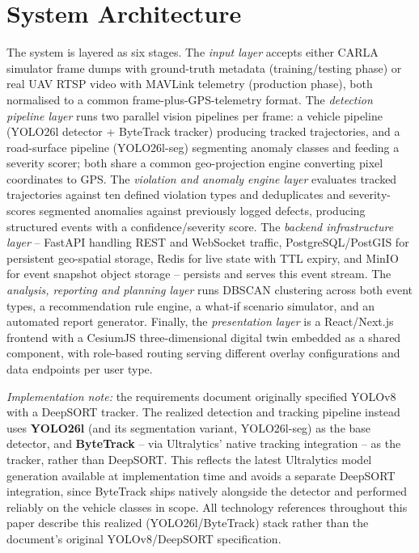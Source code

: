 \documentclass[conference]{IEEEtran}
\begin{document}
\section{System Architecture}
\label{sec:architecture}

The system is layered as six stages. The \textit{input layer} accepts either CARLA simulator frame dumps with ground-truth metadata (training/testing phase) or real UAV RTSP video with MAVLink telemetry (production phase), both normalised to a common frame-plus-GPS-telemetry format. The \textit{detection pipeline layer} runs two parallel vision pipelines per frame: a vehicle pipeline (YOLO26l detector + ByteTrack tracker) producing tracked trajectories, and a road-surface pipeline (YOLO26l-seg) segmenting anomaly classes and feeding a severity scorer; both share a common geo-projection engine converting pixel coordinates to GPS. The \textit{violation and anomaly engine layer} evaluates tracked trajectories against ten defined violation types and deduplicates and severity-scores segmented anomalies against previously logged defects, producing structured events with a confidence/severity score. The \textit{backend infrastructure layer} -- FastAPI handling REST and WebSocket traffic, PostgreSQL/PostGIS for persistent geo-spatial storage, Redis for live state with TTL expiry, and MinIO for event snapshot object storage -- persists and serves this event stream. The \textit{analysis, reporting and planning layer} runs DBSCAN clustering across both event types, a recommendation rule engine, a what-if scenario simulator, and an automated report generator. Finally, the \textit{presentation layer} is a React/Next.js frontend with a CesiumJS three-dimensional digital twin embedded as a shared component, with role-based routing serving different overlay configurations and data endpoints per user type.

\textit{Implementation note:} the requirements document originally specified YOLOv8 with a DeepSORT tracker. The realized detection and tracking pipeline instead uses \textbf{YOLO26l} (and its segmentation variant, YOLO26l-seg) as the base detector, and \textbf{ByteTrack} -- via Ultralytics' native tracking integration -- as the tracker, rather than DeepSORT. This reflects the latest Ultralytics model generation available at implementation time and avoids a separate DeepSORT integration, since ByteTrack ships natively alongside the detector and performed reliably on the vehicle classes in scope. All technology references throughout this paper describe this realized (YOLO26l/ByteTrack) stack rather than the document's original YOLOv8/DeepSORT specification.
\end{document}
